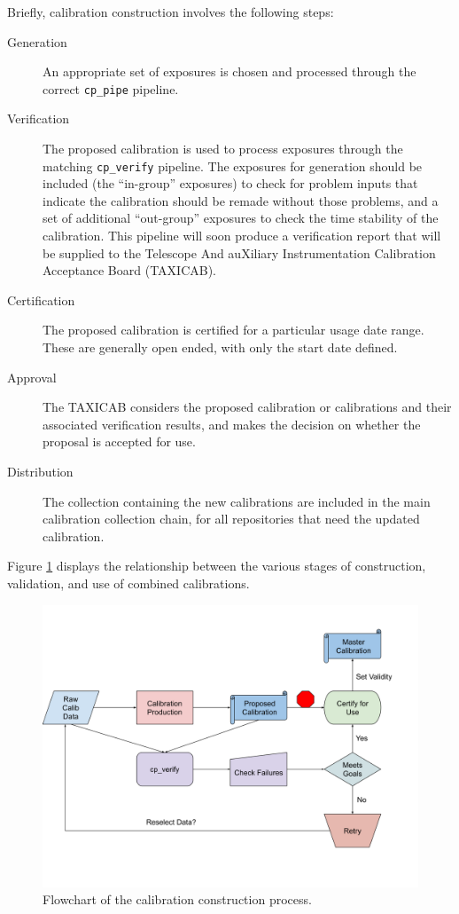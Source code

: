 \documentclass[DM,authoryear,toc]{lsstdoc}
\begin{document}
Briefly, calibration construction involves the following steps:
\begin{description}
\item[Generation] An appropriate set of exposures is chosen and processed through the correct \verb|cp_pipe| pipeline.
\item[Verification] The proposed calibration is used to process exposures through the matching \verb|cp_verify| pipeline.  The exposures for generation should be included (the ``in-group'' exposures) to check for problem inputs that indicate the calibration should be remade without those problems, and a set of additional ``out-group'' exposures to check the time stability of the calibration.  This pipeline will soon produce a verification report that will be supplied to the Telescope And auXiliary Instrumentation Calibration Acceptance Board (TAXICAB).
\item[Certification] The proposed calibration is certified for a particular usage date range.  These are generally open ended, with only the start date defined.
\item[Approval] The TAXICAB considers the proposed calibration or calibrations and their associated verification results, and makes the decision on whether the proposal is accepted for use.
\item[Distribution] The collection containing the new calibrations are included in the main calibration collection chain, for all repositories that need the updated calibration.
\end{description}

Figure \ref{fig:flowchart} displays the relationship between the various stages of construction, validation, and use of combined calibrations.

\begin{figure}
  \includegraphics[width=\linewidth]{figures/flowchart.png}
  \caption{Flowchart of the calibration construction process.}
  \label{fig:flowchart}
\end{figure}
\end{document}

